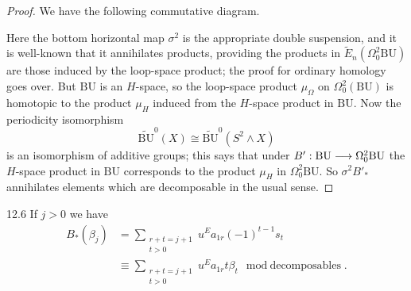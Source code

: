 \documentclass[../main]{subfiles}
\begin{document}
\begin{proof}
We have the following commutative diagram.
\begin{center}
\end{center}
Here the bottom horizontal map $\sigma^2$ is the appropriate double suspension, and it is well-known that it annihilates products, providing the products in $\widetilde{E}_n(\Omega_0^2\mathrm{BU})$ are those induced by the loop-space product; the proof for ordinary homology goes over. But $\mathrm{BU}$ is an $H$-space, so the loop-space product $\mu_\Omega$ on $\Omega_0^2(\mathrm{BU})$ is homotopic to the product $\mu_H$ induced from the $H$-space product in $\mathrm{BU}$. Now the periodicity isomorphism \[\widetilde{\mathrm{BU}}^0(X)\cong \widetilde{\mathrm{BU}}^0(S^2\wedge X)\] is an isomorphism of additive groups; this says that under $B':\mathrm{BU}\longrightarrow\Omega^2_0\mathrm{BU}$ the $H$-space product in $\mathrm{BU}$ corresponds to the product $\mu_H$ in $\Omega_0^2\mathrm{BU}$. So $\sigma^2B'_\ast$ annihilates elements which are decomposable in the usual sense.
\end{proof}
\begin{customprop}{12.6}
\label{prop:p2c12.6}
If $j>0$ we have
\begin{align*}
B_\ast(\beta_j) &= \sum_{\substack{r+t=j+1\\t>0}} u^E a_{1r} (-1)^{t-1}s_t\\
&\equiv \sum_{\substack{r+t=j+1\\t>0}} u^E a_{1r} t\beta_t \mod{\text{decomposables}}.
\end{align*}
\end{customprop}
\end{document}

